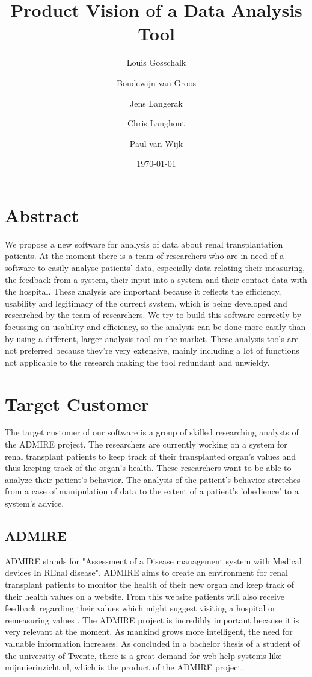\documentclass[a4paper]{article}
\title{Product Vision of a Data Analysis Tool}
\author[1]{Louis Gosschalk}
\author[2]{Boudewijn van Groos}
\author[3]{Jens Langerak}
\author[4]{Chris Langhout}
\author[5]{Paul van Wijk}
\affil[1]{lgosschalk \\
4214528}
\affil[2]{bvangroos \\
4229843}
\affil[3]{jlangerak \\
4317327}
\affil[4]{clanghout \\
4281705}
\affil[5]{pvanwijk \\
4285034}
\affil[ ]{Health Informatics Group C}
\date{\today}
\begin{document}
\maketitle

\section*{Abstract}
We propose a new software for analysis of data about renal transplantation patients. At the moment there is a team of researchers who are in need of a software to easily analyse patients' data, especially data relating their measuring, the feedback from a system, their input into a system and their contact data with the hospital. These analysis are important because it reflects the efficiency, usability and legitimacy of the current system, which is being developed and researched by the team of researchers. We try to build this software correctly by focussing on usability and efficiency, so the analysis can be done more easily than by using a different, larger analysis tool on the market. These analysis tools are not preferred because they're very extensive, mainly including a lot of functions not applicable to the research making the tool redundant and unwieldy. 

\newpage

\tableofcontents

\newpage

\section{Target Customer}
The target customer of our software is a group of skilled researching analysts of the ADMIRE project. The researchers are currently working on a system for renal transplant patients to keep track of their transplanted organ's values and thus keeping track of the organ's health. These researchers want to be able to analyze their patient's behavior. The analysis of the patient's behavior stretches from a case of manipulation of data to the extent of a patient's 'obedience' to a system's advice. 

\subsection{ADMIRE}
ADMIRE stands for "Assessment of a Disease management system with Medical devices In REnal disease". ADMIRE aims to create an environment for renal transplant patients to monitor the health of their new organ and keep track of their health values on a website. From this website patients will also receive feedback regarding their values which might suggest visiting a hospital or remeasuring values \cite{Admire}. The ADMIRE project is incredibly important because it is very relevant at the moment. As mankind grows more intelligent, the need for valuable information increases. As concluded in a bachelor thesis of a student of the university of Twente, there is a great demand for web help systems \cite{twente} like mijnnierinzicht.nl, which is the product of the ADMIRE project.
\end{document}
